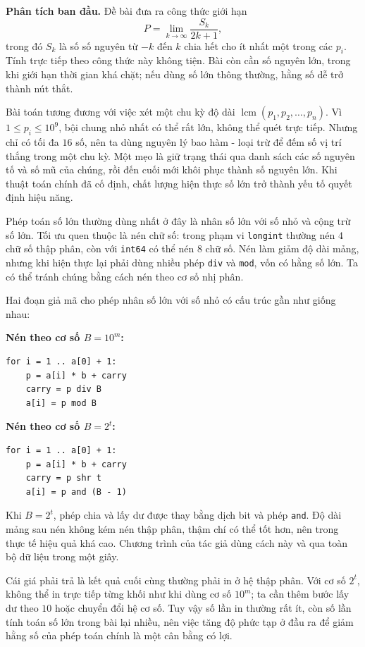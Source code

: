 \documentclass[11pt]{article}
\begin{document}
\textbf{Phân tích ban đầu.} Đề bài đưa ra công thức giới hạn
\[
  P=\lim_{k\to\infty}\frac{S_k}{2k+1},
\]
trong đó \(S_k\) là số số nguyên từ \(-k\) đến \(k\) chia hết cho ít nhất một
trong các \(p_i\). Tính trực tiếp theo công thức này không tiện. Bài còn cần
số nguyên lớn, trong khi giới hạn thời gian khá chặt; nếu dùng số lớn thông
thường, hằng số dễ trở thành nút thắt.

Bài toán tương đương với việc xét một chu kỳ độ dài
\(\operatorname{lcm}(p_1,p_2,\ldots,p_n)\). Vì \(1\le p_i\le 10^9\), bội
chung nhỏ nhất có thể rất lớn, không thể quét trực tiếp. Nhưng chỉ có tối đa
\(16\) số, nên ta dùng nguyên lý bao hàm - loại trừ để đếm số vị trí thắng
trong một chu kỳ. Một mẹo là giữ trạng thái qua danh sách các số nguyên tố và
số mũ của chúng, rồi đến cuối mới khôi phục thành số nguyên lớn. Khi thuật
toán chính đã cố định, chất lượng hiện thực số lớn trở thành yếu tố quyết
định hiệu năng.

Phép toán số lớn thường dùng nhất ở đây là nhân số lớn với số nhỏ và cộng
trừ số lớn. Tối ưu quen thuộc là nén chữ số: trong phạm vi \texttt{longint}
thường nén \(4\) chữ số thập phân, còn với \texttt{int64} có thể nén \(8\)
chữ số. Nén làm giảm độ dài mảng, nhưng khi hiện thực lại phải dùng nhiều
phép \texttt{div} và \texttt{mod}, vốn có hằng số lớn. Ta có thể tránh chúng
bằng cách nén theo cơ số nhị phân.

Hai đoạn giả mã cho phép nhân số lớn với số nhỏ có cấu trúc gần như giống
nhau:

\noindent\textbf{Nén theo cơ số \(B=10^m\):}
\begin{verbatim}
for i = 1 .. a[0] + 1:
    p = a[i] * b + carry
    carry = p div B
    a[i] = p mod B
\end{verbatim}

\noindent\textbf{Nén theo cơ số \(B=2^t\):}
\begin{verbatim}
for i = 1 .. a[0] + 1:
    p = a[i] * b + carry
    carry = p shr t
    a[i] = p and (B - 1)
\end{verbatim}

Khi \(B=2^t\), phép chia và lấy dư được thay bằng dịch bit và phép
\texttt{and}. Độ dài mảng sau nén không kém nén thập phân, thậm chí có thể
tốt hơn, nên trong thực tế hiệu quả khá cao. Chương trình của tác giả dùng
cách này và qua toàn bộ dữ liệu trong một giây.

Cái giá phải trả là kết quả cuối cùng thường phải in ở hệ thập phân. Với cơ
số \(2^t\), không thể in trực tiếp từng khối như khi dùng cơ số \(10^m\); ta
cần thêm bước lấy dư theo \(10\) hoặc chuyển đổi hệ cơ số. Tuy vậy số lần in
thường rất ít, còn số lần tính toán số lớn trong bài lại nhiều, nên việc
tăng độ phức tạp ở đầu ra để giảm hằng số của phép toán chính là một cân
bằng có lợi.
\end{document}
